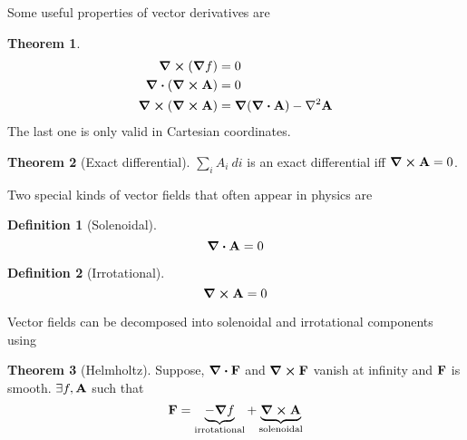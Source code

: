 \documentclass[10pt, a4paper]{extarticle}
\theoremstyle{definition}
\newtheorem{thm}{Theorem}
\newtheorem{defn}{Definition}
\begin{document}
Some useful properties of vector derivatives are
\begin{framed}
	\begin{thm}
		\begin{align*}
			\curl(\grad f)&=0\\
			\div(\curl\vb{A})&=0\\
		\curl(\curl\vb{A})&=\grad(\div\vb{A})-\laplacian\vb{A}
		\end{align*}
		The last one is only valid in Cartesian coordinates.
	\end{thm}
\end{framed}
\begin{framed}
	\begin{thm}[Exact differential]
		$\sum_i A_i\ di$ is an exact differential iff $\curl \vb{A}=0$.
	\end{thm}
\end{framed}
Two special kinds of vector fields that often appear in physics are
\begin{framed}
	\begin{defn}[Solenoidal]
		\[\div\vb{A}=0\]
	\end{defn}
	\begin{defn}[Irrotational]
		\[\curl\vb{A}=0\]
	\end{defn}
\end{framed}
Vector fields can be decomposed into solenoidal and irrotational components using
\begin{framed}
	\begin{thm}[Helmholtz]
		Suppose, $\div \vb{F}$ and $\curl\vb{F}$ vanish at infinity and $\vb{F}$ is smooth. $\exists f,\vb{A}$ such that
		\[\vb{F}=\underbrace{-\grad f}_{\text{irrotational}}+\underbrace{\curl\vb{A}}_{\text{solenoidal}}\]
	\end{thm}
\end{framed}
\end{document}
